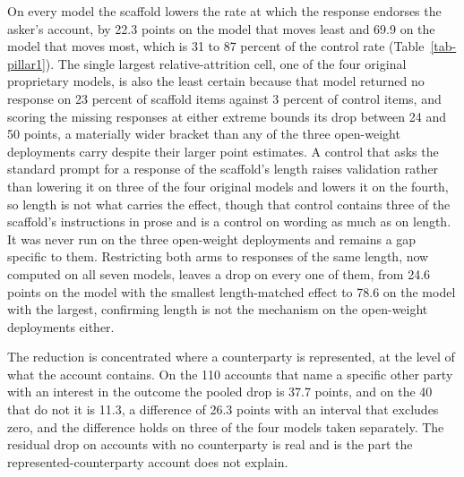 On every model the scaffold lowers the rate at which the response endorses
the asker's account, by 22.3 points on the model that moves least and 69.9
on the model that moves most,
which is 31 to 87 percent of the control rate
(Table~\ref{tab-pillar1}). The single largest relative-attrition cell,
one of the four original proprietary models, is also the least certain
because that model returned no response on 23 percent of scaffold items
against 3 percent of control items,
and scoring the missing responses at either extreme bounds its drop
between 24 and 50 points, a materially wider bracket than any of the
three open-weight deployments carry despite their larger point estimates.
A control that asks the standard prompt for a response of the scaffold's
length raises validation rather than lowering it on three of the four
original models
and lowers it on the fourth,
so length is not what carries the effect, though that control contains
three of the scaffold's instructions in prose and is a control on wording
as much as on length. It was never run on the three open-weight
deployments and remains a gap specific to them.
Restricting both arms to responses of the same length, now computed on
all seven models, leaves a drop on every one of them, from 24.6 points
on the model with the smallest length-matched effect to 78.6 on the
model with the largest, confirming length is not the mechanism on the
open-weight deployments either.

The reduction is concentrated where a counterparty is represented, at
the level of what the account contains.
On the 110 accounts that name a specific other party with an interest in
the outcome the pooled drop is 37.7 points, and on the 40 that do not it is
11.3, a difference of 26.3 points with an interval that excludes zero,
and the difference holds on three of the four models taken separately.
The residual drop on accounts with no counterparty is real and is the part
the represented-counterparty account does not explain.

